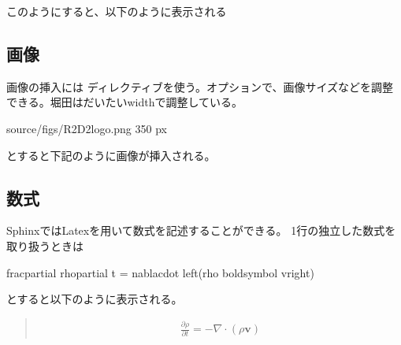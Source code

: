 \documentclass[letterpaper,10pt,dvipdfmx,report]{sphinxmanual}
\let\sphinxpxdimen\pdfpxdimen\else\newdimen\sphinxpxdimen
\begin{document}
このようにすると、以下のように表示される

\begin{sphinxVerbatim}[commandchars=\\\{\}]
  

  
  
    
\end{sphinxVerbatim}


\subsection{画像}
\label{\detokenize{sphinx:id9}}
画像の挿入には  ディレクティブを使う。オプションで、画像サイズなどを調整できる。堀田はだいたいwidthで調整している。

\begin{sphinxVerbatim}[commandchars=\\\{\}]
  source/figs/R2D2\PYGZus{}logo.png
     350 px
\end{sphinxVerbatim}

とすると下記のように画像が挿入される。

\noindent\sphinxincludegraphics[width=350\sphinxpxdimen]{{R2D2_logo}.png}


\subsection{数式}
\label{\detokenize{sphinx:id10}}
SphinxではLatexを用いて数式を記述することができる。
1行の独立した数式を取り扱うときは

\begin{sphinxVerbatim}[commandchars=\\\{\}]
  

    \PYGZbs{}frac\PYGZob{}\PYGZbs{}partial \PYGZbs{}rho\PYGZcb{}\PYGZob{}\PYGZbs{}partial t\PYGZcb{} = \PYGZhy{}\PYGZbs{}nabla\PYGZbs{}cdot \PYGZbs{}left(\PYGZbs{}rho \PYGZob{}\PYGZbs{}boldsymbol v\PYGZcb{}\PYGZbs{}right)
\end{sphinxVerbatim}

とすると以下のように表示される。
\begin{quote}
\begin{equation*}
\begin{split}\frac{\partial \rho}{\partial t} = -\nabla\cdot \left(\rho {\boldsymbol v}\right)\end{split}
\end{equation*}\end{quote}
\end{document}
